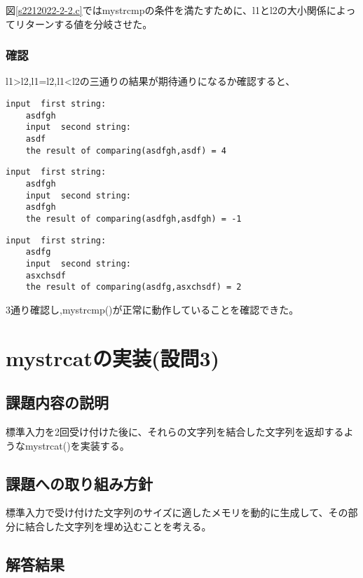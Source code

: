 \documentclass[fontsize = 10pt, paper= a4,twocolumn,column_gap=3zw]{jlreq}
\begin{document}
図\ref{s2212022-2-2.c}ではmystrcmpの条件を満たすために、l1とl2の大小関係によってリターンする値を分岐させた。

\subsubsection{確認}
l1>l2,l1=l2,l1<l2の三通りの結果が期待通りになるか確認すると、
\begin{lstlisting}[basicstyle=\ttfamily\footnotesize, frame=single, caption=test6,label=test6]
    input  first string:
    asdfgh
    input  second string:
    asdf
    the result of comparing(asdfgh,asdf) = 4
\end{lstlisting}

\begin{lstlisting}[basicstyle=\ttfamily\footnotesize, frame=single, caption=test7,label=test7]
    input  first string:
    asdfgh
    input  second string:
    asdfgh
    the result of comparing(asdfgh,asdfgh) = -1    
\end{lstlisting}

\begin{lstlisting}[basicstyle=\ttfamily\footnotesize, frame=single, caption=test8,label=test8]
    input  first string:
    asdfg
    input  second string:
    asxchsdf
    the result of comparing(asdfg,asxchsdf) = 2     
\end{lstlisting}

3通り確認し,mystrcmp()が正常に動作していることを確認できた。

\section{mystrcatの実装(設問3)}
\subsection{課題内容の説明}
標準入力を2回受け付けた後に、それらの文字列を結合した文字列を返却するようなmystrcat()を実装する。
\subsection{課題への取り組み方針}
標準入力で受け付けた文字列のサイズに適したメモリを動的に生成して、その部分に結合した文字列を埋め込むことを考える。
\subsection{解答結果}
\end{document}
